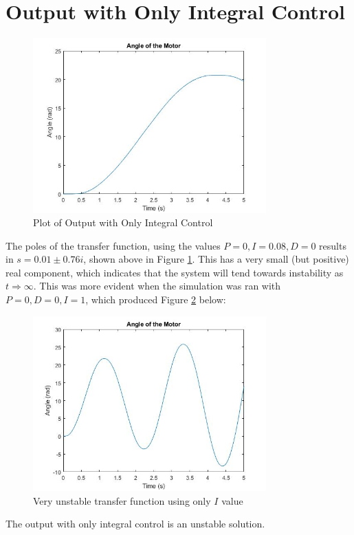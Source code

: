 \section{Output with Only Integral Control}
\begin{figure}[H]
	\centering
	\includegraphics[width=0.8\textwidth]{./figures/lab3_10rad_oscillations.jpg}

	\caption{Plot of Output with Only Integral Control}
	\label{fig:int}
\end{figure}
The poles of the transfer function, using the values \(P = 0, I = 0.08, D = 0\) results in \(s = 0.01 \pm 0.76i\), shown above in Figure \ref{fig:int}. This has a very small (but positive) real component, which indicates that the system will tend towards instability as \(t \Rightarrow \infty\). This was more evident when the simulation was ran with \(P=0, D=0, I=1\), which produced Figure \ref{fig:unstable} below:
\begin{figure}[H]
	\centering
	\includegraphics[width=0.8\textwidth]{./figures/lab3_integral_unstable.jpg}
	\caption{Very unstable transfer function using only $I$ value}
	\label{fig:unstable}
\end{figure}
The output with only integral control is an unstable solution. 

